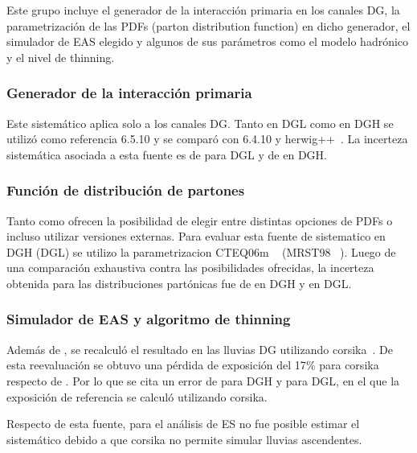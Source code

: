 	Este grupo incluye el generador de la interacción primaria en los canales DG, la parametrización de las PDFs (parton distribution function) en dicho generador, el simulador de EAS elegido y algunos de sus parámetros como el modelo hadrónico y el nivel de thinning.
	
		\subsubsection{Generador de la interacción primaria}
		
		Este sistemático aplica solo a los canales DG.
		Tanto en DGL como en DGH se utilizó como referencia \herwig{} 6.5.10 \cite{herwigRef} y se comparó con \pythia{} 6.4.10\cite{pythia} y {\sc herwig++}~\cite{herwig++}.
		La incerteza sistemática asociada a esta fuente es de  para DGL y de  en DGH.
		
		\subsubsection{Función de distribución de partones}
		
		Tanto \herwig{} como \pythia{} ofrecen la posibilidad de elegir entre distintas opciones de PDFs o incluso utilizar versiones externas. Para evaluar esta fuente de sistematico en DGH (DGL) se utilizo la parametrizacion CTEQ06m ~\cite{CTEQ06m} (MRST98 ~\cite{MRST98}).
		Luego de una comparación exhaustiva contra las posibilidades ofrecidas, la incerteza obtenida para las distribuciones partónicas fue de  en DGH y  en DGL.
		
		\subsubsection{Simulador de EAS y algoritmo de thinning}
		
		Además de \aires{}, se recalculó el resultado en las lluvias DG utilizando {\sc corsika}~\cite{corsika}.
		De esta reevaluación se obtuvo una pérdida de exposición del 17$\%$ para {\sc corsika} respecto de \aires{}.
		Por lo que se cita un error de  para DGH y  para DGL, en el que la exposición de referencia se calculó utilizando {\sc corsika}.
		
		Respecto de esta fuente, para el análisis de ES no fue posible estimar el sistemático debido a que {\sc corsika} no permite simular lluvias ascendentes. 
		
